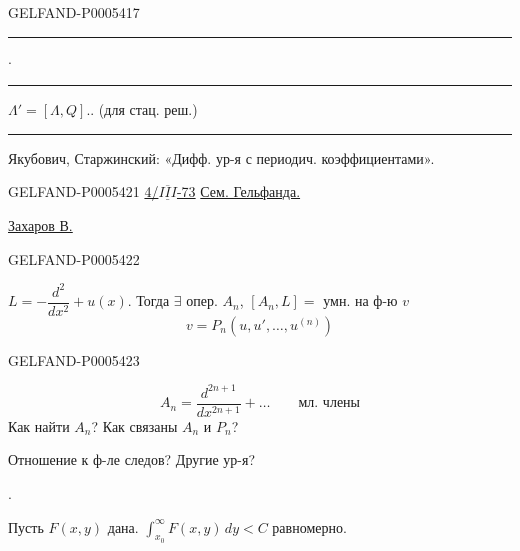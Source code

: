 \begin{GelfandAdjacentEvidence}{GELFAND-P000541}{7}

\hfill\rule{1.35cm}{.35pt}\enspace\(\cdot\)\enspace\rule{1.35cm}{.35pt}\par

\(\Lambda'=[\Lambda,Q]\).\qquad {}. (для стац. реш.)

\noindent\rule{\linewidth}{.35pt}\par
Якубович, Старжинский: «Дифф. ур-я с периодич. коэффициентами».
\end{GelfandAdjacentEvidence}



\begin{GelfandAdjacentEvidence}{GELFAND-P000542}{1}
\uline{4/\mbox{$\overline{\underline{III}}$}-73}
\qquad\uline{Сем. Гельфанда.}

\uline{Захаров В.}
\end{GelfandAdjacentEvidence}
\begin{GelfandAdjacentEvidence}{GELFAND-P000542}{2}


\quad \(L=-\dfrac{d^2}{dx^2}+u(x)\).
Тогда \(\exists\) опер. \(A_n\),
\([A_n,L]={}\) умн. на ф-ю \(v\)
\[
v=P_n(u,u',\ldots,u^{(n)})
\]
\end{GelfandAdjacentEvidence}
\begin{GelfandAdjacentEvidence}{GELFAND-P000542}{3}

\[
A_n=\frac{d^{2n+1}}{dx^{2n+1}}+\ldots
\qquad\text{мл. члены}
\]
Как найти \(A_n\)? Как связаны \(A_n\) и \(P_n\)?

Отношение к ф-ле следов? Другие ур-я?

\quad{}.

Пусть \(F(x,y)\) дана.
\(\displaystyle\int_{x_0}^\infty F(x,y)\,dy<C\) равномерно.
\end{GelfandAdjacentEvidence}
